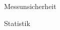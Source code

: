 \documentclass{beamer}
\begin{document}












    



\begin{frame}{Messunsicherheit}

    
\end{frame}


\begin{frame}{Statistik}


    
\end{frame}
\end{document}
